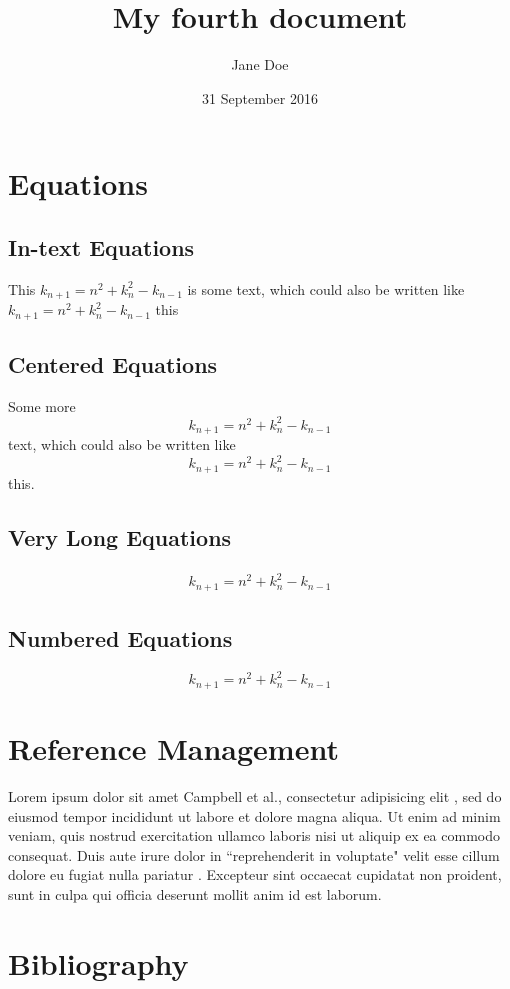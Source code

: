 \documentclass{article}
\title{My fourth document}
\author{Jane Doe}
\date{31 September 2016}
\begin{document}
\maketitle
\tableofcontents{}

\section{Equations}
\subsection{In-text Equations}
This \begin{math}
	k_{n+1} = n^2 + k_n^2 - k_{n-1}
\end{math} is some text, which could also be written like $k_{n+1} = n^2 + k_n^2 - k_{n-1}$ this

\subsection{Centered Equations}
Some more
\begin{displaymath}
	k_{n+1} = n^2 + k_n^2 - k_{n-1}
\end{displaymath}
text, which could also be written like 
$$ k_{n+1} = n^2 + k_n^2 - k_{n-1} $$
this. 

\subsection{Very Long Equations}
\begin{eqnarray}
	k_{n+1} = n^2 + k_n^2 - k_{n-1}
\end{eqnarray}

\subsection{Numbered Equations}
\begin{equation}
	k_{n+1} = n^2 + k_n^2 - k_{n-1}
\end{equation}

\section{Reference Management}

Lorem ipsum dolor sit amet Campbell et al., consectetur adipisicing elit \citeyearpar{Campbell.1960}, sed do eiusmod tempor incididunt ut labore et dolore magna aliqua. Ut enim ad minim veniam, quis nostrud exercitation ullamco laboris nisi ut aliquip ex ea commodo consequat. Duis aute irure dolor in ``reprehenderit in voluptate" \citeyearpar[151]{Achen.2002} velit esse cillum dolore eu fugiat nulla pariatur \citep{Achen.1992}. Excepteur sint occaecat cupidatat non proident, sunt in culpa \citet{Jackson.1975} qui officia deserunt mollit anim id est laborum. \citep[see][]{Lazarsfeld.1948,Campbell.1953,Daudt.1961,Key.1966}


\section{Bibliography}


\renewcommand{\section}[2]{} %
 
\end{document}
